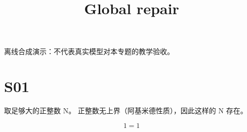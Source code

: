\documentclass[UTF8,fontset=fandol,11pt]{ctexart}
\title{Global repair}
\date{}
\begin{document}
\maketitle
\par\noindent 离线合成演示：不代表真实模型对本专题的教学验收。\par
\section{S01}\label{sec:S01}
取足够大的正整数 N。 正整数无上界（阿基米德性质），因此这样的 N 存在。\par
\begin{equation}1=1\label{eq:old-unchecked}\end{equation}\par
\end{document}
